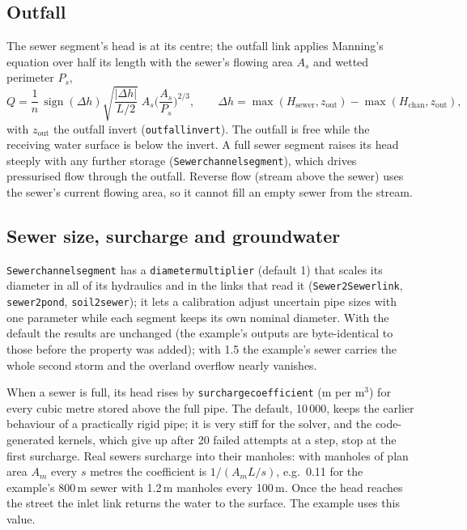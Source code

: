 \documentclass[11pt,a4paper]{article}
\newcommand{\code}[1]{\texttt{\small #1}}
\renewcommand{\_}{\oldus\allowbreak}   %
\begin{document}
\subsection{Outfall}
The sewer segment's head is at its centre; the outfall link applies Manning's equation over half
its length with the sewer's flowing area $A_s$ and wetted perimeter $P_s$,
\begin{equation}
Q = \frac{1}{n}\,\operatorname{sign}(\Delta h)\sqrt{\frac{|\Delta h|}{L/2}}\;A_s\Big(\frac{A_s}{P_s}\Big)^{2/3},\qquad
\Delta h = \max(H_{\mathrm{sewer}},z_{\mathrm{out}})-\max(H_{\mathrm{chan}},z_{\mathrm{out}}),
\end{equation}
with $z_{\mathrm{out}}$ the outfall invert (\code{outfall\_invert}). The outfall is free while the
receiving water surface is below the invert. A full sewer segment raises its head steeply with any
further storage (\code{Sewerchannelsegment}), which drives pressurised flow through the outfall.
Reverse flow (stream above the sewer) uses the sewer's current flowing area, so it cannot fill an
empty sewer from the stream.

\subsection{Sewer size, surcharge and groundwater}
\code{Sewerchannelsegment} has a \code{diameter\_multiplier} (default 1) that scales its diameter in
all of its hydraulics and in the links that read it (\code{Sewer2Sewer\_link}, \code{sewer2pond},
\code{soil2sewer}); it lets a calibration adjust uncertain pipe sizes with one parameter while each
segment keeps its own nominal diameter. With the default the results are unchanged (the example's
outputs are byte-identical to those before the property was added); with 1.5 the example's sewer
carries the whole second storm and the overland overflow nearly vanishes.

When a sewer is full, its head rises by \code{surcharge\_coefficient} (m per m$^3$) for every cubic
metre stored above the full pipe. The default, 10\,000, keeps the earlier behaviour of a practically
rigid pipe; it is very stiff for the solver, and the code-generated kernels, which give up after 20
failed attempts at a step, stop at the first surcharge. Real sewers surcharge into their manholes:
with manholes of plan area $A_m$ every $s$ metres the coefficient is $1/(A_m L/s)$, e.g.\ 0.11 for the
example's 800\,m sewer with 1.2\,m manholes every 100\,m. Once the head reaches the street the inlet
link returns the water to the surface. The example uses this value.
\end{document}
